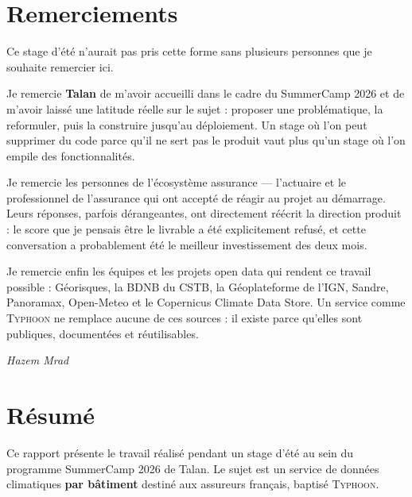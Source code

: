 \documentclass[11pt,a4paper,oneside]{report}
\newcommand{\typhoon}{\textsc{Typhoon}}
\begin{document}
\chapter*{Remerciements}

Ce stage d'été n'aurait pas pris cette forme sans plusieurs personnes que je
souhaite remercier ici.

Je remercie \textbf{Talan} de m'avoir accueilli dans le cadre du SummerCamp
2026 et de m'avoir laissé une latitude réelle sur le sujet : proposer une
problématique, la reformuler, puis la construire jusqu'au déploiement. Un stage
où l'on peut supprimer du code parce qu'il ne sert pas le produit vaut plus
qu'un stage où l'on empile des fonctionnalités.

Je remercie les personnes de l'écosystème assurance — l'actuaire et le
professionnel de l'assurance qui ont accepté de réagir au projet au démarrage.
Leurs réponses, parfois dérangeantes, ont directement réécrit la direction
produit : le \og score \fg{} que je pensais être le livrable a été explicitement
refusé, et cette conversation a probablement été le meilleur investissement des
deux mois.

Je remercie enfin les équipes et les projets open data qui rendent ce travail
possible : Géorisques, la BDNB du CSTB, la Géoplateforme de l'IGN, Sandre,
Panoramax, Open-Meteo et le Copernicus Climate Data Store. Un service comme
\typhoon{} ne remplace aucune de ces sources : il existe parce qu'elles sont
publiques, documentées et réutilisables.

\vspace{1em}
\begin{flushright}
\textit{Hazem Mrad}
\end{flushright}

\chapter*{Résumé}

Ce rapport présente le travail réalisé pendant un stage d'été au sein du
programme SummerCamp 2026 de Talan. Le sujet est un service de données
climatiques \textbf{par bâtiment} destiné aux assureurs français, baptisé
\typhoon{}.
\end{document}
